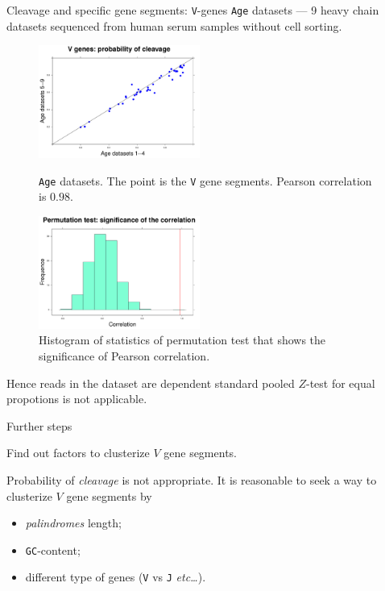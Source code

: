 \documentclass{beamer}\usepackage[]{graphicx}\usepackage[]{color}
\begin{document}
\begin{frame}{Cleavage and specific gene segments: \texttt{V}-genes}
  \texttt{Age} datasets --- 9 heavy chain datasets sequenced from human serum samples without cell sorting. 
  \begin{figure}[h]
  \begin{minipage}[h]{0.49\linewidth}
  \center\includegraphics[width=150pt]{Vgen_cleavage_age.pdf}
    \caption{\footnotesize{\texttt{Age} datasets. The point is the \texttt{V} gene segments. Pearson correlation is $0.98$.}} 
  \end{minipage}
  \hfill
  \begin{minipage}[h]{0.49\linewidth}
   \includegraphics[width=150pt]{Vgen_cleavage_age_correlation.pdf}
    \caption{\footnotesize{Histogram of statistics of permutation test that shows the significance of Pearson correlation.}} 
  \end{minipage}
 \end{figure}
 \pause
 {\color{blue} Hence reads in the dataset are dependent standard pooled $Z$-test for equal propotions is not applicable.}
 
\end{frame}

\begin{frame}{Further steps}
  
  Find out factors to clusterize $V$ gene segments.

  \bigskip 
  Probability of \textit{cleavage} is not appropriate.  
  It is reasonable to seek a way to clusterize $V$ gene segments by
  \begin{itemize}
    \item \textit{palindromes} length;
    \item \texttt{GC}-content;
    \item different type of genes (\texttt{V} vs \texttt{J} \textit{etc\ldots}).
  \end{itemize}
\end{frame}
\end{document}
